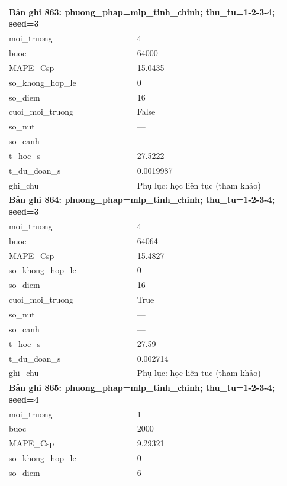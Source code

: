 \begin{longtable}{p{0.43\linewidth}p{0.50\linewidth}}
\midrule
\multicolumn{2}{p{0.95\linewidth}}{\textbf{Bản ghi 863: phuong\_phap=mlp\_tinh\_chinh; thu\_tu=1-2-3-4; seed=3}} \\
moi\_\allowbreak truong & 4 \\
buoc & 64000 \\
MAPE\_\allowbreak Csp & 15.0435 \\
so\_\allowbreak khong\_\allowbreak hop\_\allowbreak le & 0 \\
so\_\allowbreak diem & 16 \\
cuoi\_\allowbreak moi\_\allowbreak truong & False \\
so\_\allowbreak nut & — \\
so\_\allowbreak canh & — \\
t\_\allowbreak hoc\_\allowbreak s & 27.5222 \\
t\_\allowbreak du\_\allowbreak doan\_\allowbreak s & 0.0019987 \\
ghi\_\allowbreak chu & Phụ lục: học liên tục (tham khảo) \\
\midrule
\multicolumn{2}{p{0.95\linewidth}}{\textbf{Bản ghi 864: phuong\_phap=mlp\_tinh\_chinh; thu\_tu=1-2-3-4; seed=3}} \\
moi\_\allowbreak truong & 4 \\
buoc & 64064 \\
MAPE\_\allowbreak Csp & 15.4827 \\
so\_\allowbreak khong\_\allowbreak hop\_\allowbreak le & 0 \\
so\_\allowbreak diem & 16 \\
cuoi\_\allowbreak moi\_\allowbreak truong & True \\
so\_\allowbreak nut & — \\
so\_\allowbreak canh & — \\
t\_\allowbreak hoc\_\allowbreak s & 27.59 \\
t\_\allowbreak du\_\allowbreak doan\_\allowbreak s & 0.002714 \\
ghi\_\allowbreak chu & Phụ lục: học liên tục (tham khảo) \\
\midrule
\multicolumn{2}{p{0.95\linewidth}}{\textbf{Bản ghi 865: phuong\_phap=mlp\_tinh\_chinh; thu\_tu=1-2-3-4; seed=4}} \\
moi\_\allowbreak truong & 1 \\
buoc & 2000 \\
MAPE\_\allowbreak Csp & 9.29321 \\
so\_\allowbreak khong\_\allowbreak hop\_\allowbreak le & 0 \\
so\_\allowbreak diem & 6 \\

\end{longtable}
